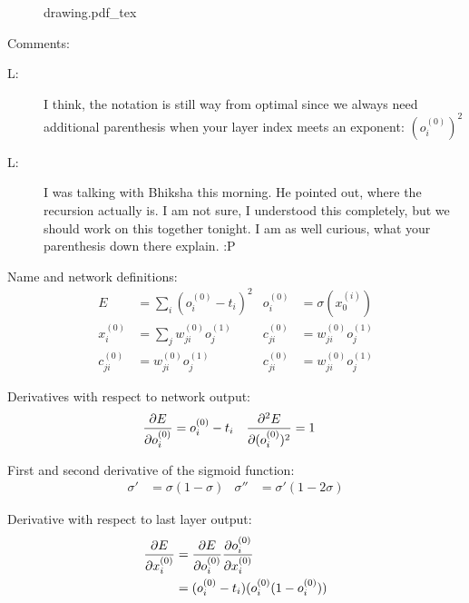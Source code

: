 \documentclass{article}
\newcommand{\Out}[2]{o_{#1}^{(#2)}}
\newcommand{\Target}[1]{t_{#1}}
\newcommand{\Input}[2]{x_{#1}^{(#2)}}
\newcommand{\Weight}[3]{w_{#1#2}^{(#3)}}
\newcommand{\Con}[3]{c_{#1#2}^{(#3)}}
\begin{document}
\begin{figure}
\centering
\newcommand{\repSigmoid}{$\sigma(\cdot)$}
\newcommand{\repLinear}{$\sum$}
\newcommand{\repMse}{MSE}
\newcommand{\repFirstSum}{$\Input j 1$}
\newcommand{\repLastSum}{$\Input i 0$}
\newcommand{\repFirstOutput}{\hspace{1.5cm}$\Con j i 0 \!=\! \Weight j i 0 \Out j 1$}
\newcommand{\repLastOutput}{$\Out i 0$}
\newcommand{\repLoss}{$E$}
\def\svgwidth{0.9\textwidth}
{drawing.pdf_tex}
\end{figure}

Comments:
\begin{description}
\item[L:] I think, the notation is still way from optimal since we always need additional parenthesis when your layer index meets an exponent: $(\Out i 0)^2$
\item[L:] I was talking with Bhiksha this morning. He pointed out, where the recursion actually is. I am not sure, I understood this completely, but we should work on this together tonight. I am as well curious, what your parenthesis down there explain. :P
\end{description}


Name and network definitions:
\begin{align}
E &= \sum\limits_i (\Out i 0 - \Target i)^2 &
\Out i 0 &= \sigma(\Input 0 i) \\
\Input i 0 &= \sum\limits_j \Weight j i 0 \Out j 1 &
\Con j i 0 &= \Weight j i 0 \Out j 1 \\
\Con j i 0 &= \Weight j i 0 \Out j 1 &
\Con j i 0 &= \Weight j i 0 \Out j 1
\end{align}

Derivatives with respect to network output:
\begin{align}
\pdv{E}{\Out i 0} &= \Out i 0 - \Target i &
\pdv[2]{E}{(\Out i 0)} &= 1
\end{align}

First and second derivative of the sigmoid function:
\begin{align}
\sigma' &= \sigma(1 - \sigma) &
\sigma'' &= \sigma' (1 - 2 \sigma)
\end{align}

Derivative with respect to last layer output:
\begin{align}
\pdv{E}{\Input i 0} &= \pdv{E}{\Out i 0} \pdv{\Out i 0}{\Input i 0} \\
&= (\Out i 0 - \Target i)(\Out i 0 (1 - \Out i 0))
\end{align}
\end{document}
